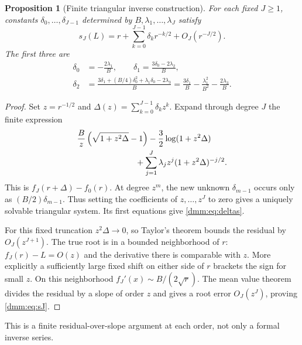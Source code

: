 \documentclass[11pt,letterpaper]{article}
\numberwithin{equation}{section}
\newtheorem{proposition}[theorem]{Proposition}
\theoremstyle{definition}\newtheorem{definition}[theorem]{Definition}
\theoremstyle{remark}\newtheorem{remark}[theorem]{Remark}
\begin{document}
\begin{proposition}[Finite triangular inverse construction]\label{dmm:prop:inverse}
For each fixed $J\ge1$, constants $\delta_0,\ldots,\delta_{J-1}$ determined by $B,\lambda_1,\ldots,\lambda_J$ satisfy
\begin{equation}\label{dmm:eq:sJ}
s_J(L)=r+\sum_{k=0}^{J-1}\delta_kr^{-k/2}+O_J(r^{-J/2}).
\end{equation}
The first three are
\begin{align}\label{dmm:eq:deltas}
\delta_0&=-\frac{2\lambda_1}{B},\qquad
\delta_1=\frac{3\delta_0-2\lambda_2}{B},\nonumber\\
\delta_2&=\frac{3\delta_1+(B/4)\delta_0^2+\lambda_1\delta_0-2\lambda_3}{B}
=\frac{3\delta_1}{B}-\frac{\lambda_1^2}{B^2}-\frac{2\lambda_3}{B}.
\end{align}
\end{proposition}
\begin{proof}
Set $z=r^{-1/2}$ and $\Delta(z)=\sum_{k=0}^{J-1}\delta_kz^k$. Expand through degree $J$ the finite expression
\begin{align}\label{dmm:eq:inverserecursion}
&\frac Bz\left(\sqrt{1+z^2\Delta}-1\right)
-\frac32\log(1+z^2\Delta)\nonumber\\
&\hspace{25mm}+\sum_{j=1}^{J}\lambda_jz^j(1+z^2\Delta)^{-j/2}.
\end{align}
This is $f_J(r+\Delta)-f_0(r)$. At degree $z^m$, the new unknown $\delta_{m-1}$ occurs only as $(B/2)\delta_{m-1}$. Thus setting the coefficients of $z,\ldots,z^J$ to zero gives a uniquely solvable triangular system. Its first equations give \eqref{dmm:eq:deltas}.

For this fixed truncation $z^2\Delta\to0$, so Taylor's theorem bounds the residual by $O_J(z^{J+1})$. The true root is in a bounded neighborhood of $r$: $f_J(r)-L=O(z)$ and the derivative there is comparable with $z$. More explicitly a sufficiently large fixed shift on either side of $r$ brackets the sign for small $z$. On this neighborhood $f_J'(x)\sim B/(2\sqrt r)$. The mean value theorem divides the residual by a slope of order $z$ and gives a root error $O_J(z^J)$, proving \eqref{dmm:eq:sJ}.
\end{proof}
This is a finite residual-over-slope argument at each order, not only a formal inverse series.
\end{document}
